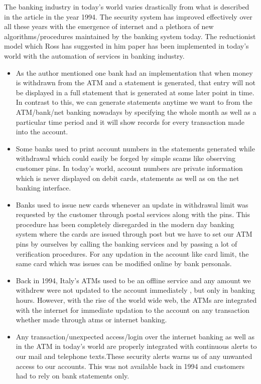 \documentclass{article}
\begin{document}
\begin{enumerate}[label=\alph*]
The banking industry in today's world varies drastically from what is described in the article in the year 1994. The security system has improved effectively over all these years with the emergence of internet and a plethora of new algorithms/procedures maintained by the banking system today. The reductionist model which Ross has suggested in him paper has been implemented in today's world with the automation of services in banking industry. 
\begin{itemize}
\item As the author mentioned one bank had an implementation that when money is withdrawn from the ATM and a statement is generated, that entry will not be displayed in a full statement that is generated at some later point in time. In contrast to this, we can generate statements anytime we want to from the ATM/bank/net banking nowadays by specifying the whole month as well as a particular time period and it will show records for every transaction made into the account.

\item Some banks used to print account numbers in the statements generated while withdrawal which could easily be forged by simple scams like observing customer pins. In today's world, account numbers are private information which is never displayed on debit cards, statements as well as on the net banking interface. 

\item Banks used to issue new cards whenever an update in withdrawal limit was requested by the customer through postal services along with the pins. This procedure has been completely disregarded in the modern day banking system where the cards are issued through post but we have to set our ATM pins by ourselves by calling the banking services and by passing a lot of verification procedures. For any updation in the account like card limit, the same card which was issues can be modified online by bank personals.  

\item Back in 1994, Italy's ATMs used to be an offline service and any amount we withdrew were not updated to the account immediately , but only in banking hours. However, with the rise of the world wide web, the ATMs are integrated with the internet for immediate updation to the account on any transaction whether made through atms or internet banking.

\item Any transaction/unexpected access/login over the internet banking as well as in the ATM in today's world are properly integrated with continuous alerts to our mail and telephone texts.These security alerts warns us of any unwanted access to our accounts. This was not available back in 1994 and customers had to rely on bank statements only.
\end{itemize}



\end{enumerate}
\end{document}
